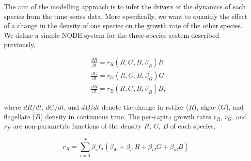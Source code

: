 \documentclass[11pt, oneside]{article}
\begin{document}
The aim of the modelling approach is to infer the drivers of the dynamics of each species from the time series data. 
More specifically, we want to quantify the effect of a change in the density of one species on the growth rate of the other species.
We define a simple NODE system for the three-species system described previously,


\vspace{-0.5cm}
\begin{equation} \begin{aligned}
	& \frac{dR}{dt} = r_R(R,G,B,\beta_R) R \\
	& \frac{dG}{dt} = r_G(R,G,B,\beta_G) G \\
	& \frac{dB}{dt} = r_B(R,G,B,\beta_B) B,
\end{aligned} \end{equation}

where $dR/dt$, $dG/dt$, and $dB/dt$ denote the change in rotifer ($R$), algae ($G$), and flagellate ($B$) density in continuous time.
The per-capita growth rates $r_R$, $r_G$, and $r_B$ are non-parametric functions of the density $R$, $G$, $B$ of each species, 

\vspace{-0.5cm}
\begin{equation}
	r_R = \sum_{i=1}^{N} \beta_{i} f_{\sigma} \left( \beta_{i0} + \beta_{i1} R + \beta_{i2} G + \beta_{i3} B \right) 
\end{equation}
\end{document}
